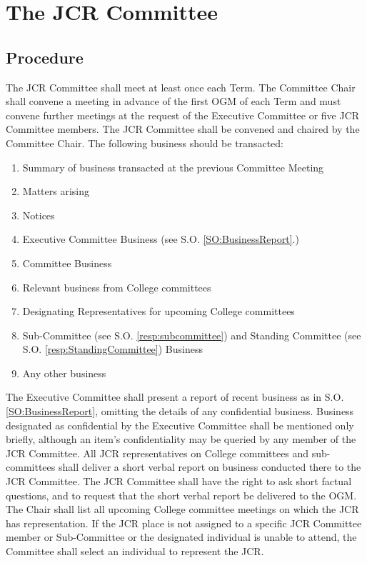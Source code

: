 \section{The JCR Committee} \label{com:jcr}
\subsection{Procedure}
\npara The JCR Committee shall meet at least once each Term. The Committee Chair shall convene a meeting in advance of the first OGM of each Term and must convene further meetings at the request of the Executive Committee or five JCR Committee members.
\npara The JCR Committee shall be convened and chaired by the Committee Chair.
\npara \label{transacted_business}The following business should be transacted:
\begin{enumerate}
	\item Summary of business transacted at the previous Committee Meeting
	\item Matters arising
	\item Notices
	\item \label{exec_business}Executive Committee Business (see S.O. \ref{SO:BusinessReport}.)
	\item Committee Business
	\item Relevant business from College committees
	\item Designating Representatives for upcoming College committees
	\item \label{SC:TransactedBusinessCommittees} Sub-Committee (see S.O. \ref{resp:subcommittee}) and Standing Committee (see S.O. \ref{resp:StandingCommittee}) Business
	\item Any other business
\end{enumerate}
\npara \label{SO:PresentBusinessReport} The Executive Committee shall present a report of recent business as in S.O. \ref{SO:BusinessReport}, omitting the details of any confidential business.
Business designated as confidential by the Executive Committee shall be mentioned only briefly, although an item's confidentiality may be queried by any member of the JCR Committee.
\npara All JCR representatives on College committees and sub-committees shall deliver a short verbal report on business conducted there to the JCR Committee.
The JCR Committee shall have the right to ask short factual questions, and to request that the short verbal report be delivered to the OGM.
\npara The Chair shall list all upcoming College committee meetings on which the JCR has representation.
If the JCR place is not assigned to a specific JCR Committee member or Sub-Committee or the designated individual is unable to attend, the Committee shall select an individual to represent the JCR.
